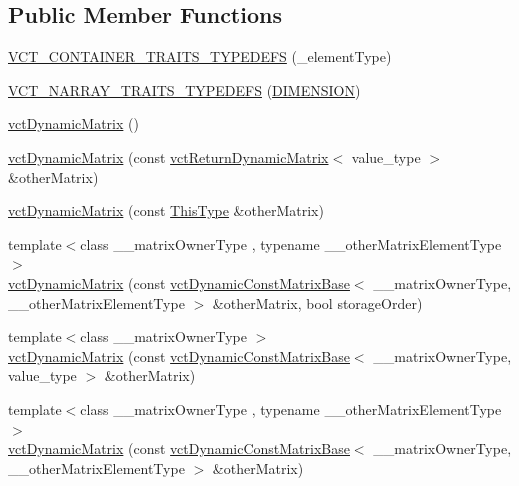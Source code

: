 \subsection*{Public Member Functions}
\begin{DoxyCompactItemize}
\item 
\hyperlink{classvct_dynamic_matrix_a2c357d90a642f7b2910e8f437a88aee2}{V\-C\-T\-\_\-\-C\-O\-N\-T\-A\-I\-N\-E\-R\-\_\-\-T\-R\-A\-I\-T\-S\-\_\-\-T\-Y\-P\-E\-D\-E\-F\-S} (\-\_\-element\-Type)
\item 
\hyperlink{classvct_dynamic_matrix_a2e3683c2478e4a056d11548af43bf186}{V\-C\-T\-\_\-\-N\-A\-R\-R\-A\-Y\-\_\-\-T\-R\-A\-I\-T\-S\-\_\-\-T\-Y\-P\-E\-D\-E\-F\-S} (\hyperlink{classvct_dynamic_matrix_a20a06ac370f39d094a3249a08644471aa6b17aeb32aa45c3a75bad3506c9218dc}{D\-I\-M\-E\-N\-S\-I\-O\-N})
\item 
\hyperlink{classvct_dynamic_matrix_a69e9c9ae97fc01a45eca8d04cef247b9}{vct\-Dynamic\-Matrix} ()
\item 
\hyperlink{classvct_dynamic_matrix_a815391e06165da8cc6c4128ff59fd802}{vct\-Dynamic\-Matrix} (const \hyperlink{classvct_return_dynamic_matrix}{vct\-Return\-Dynamic\-Matrix}$<$ value\-\_\-type $>$ \&other\-Matrix)
\item 
\hyperlink{classvct_dynamic_matrix_aa8326cf4d021f6eaa2f4eac256250728}{vct\-Dynamic\-Matrix} (const \hyperlink{classvct_dynamic_const_matrix_base_ac4ff48cbe4d9de3fdef5a02447ffb9db}{This\-Type} \&other\-Matrix)
\item 
{\footnotesize template$<$class \-\_\-\-\_\-matrix\-Owner\-Type , typename \-\_\-\-\_\-other\-Matrix\-Element\-Type $>$ }\\\hyperlink{classvct_dynamic_matrix_a760990f58362687ee4cc3502ee90506c}{vct\-Dynamic\-Matrix} (const \hyperlink{classvct_dynamic_const_matrix_base}{vct\-Dynamic\-Const\-Matrix\-Base}$<$ \-\_\-\-\_\-matrix\-Owner\-Type, \-\_\-\-\_\-other\-Matrix\-Element\-Type $>$ \&other\-Matrix, bool storage\-Order)
\item 
{\footnotesize template$<$class \-\_\-\-\_\-matrix\-Owner\-Type $>$ }\\\hyperlink{classvct_dynamic_matrix_a38239f2b95f6e13a94cef953b770de40}{vct\-Dynamic\-Matrix} (const \hyperlink{classvct_dynamic_const_matrix_base}{vct\-Dynamic\-Const\-Matrix\-Base}$<$ \-\_\-\-\_\-matrix\-Owner\-Type, value\-\_\-type $>$ \&other\-Matrix)
\item 
{\footnotesize template$<$class \-\_\-\-\_\-matrix\-Owner\-Type , typename \-\_\-\-\_\-other\-Matrix\-Element\-Type $>$ }\\\hyperlink{classvct_dynamic_matrix_aa1aa433c332439a0f80c4c5518e2b790}{vct\-Dynamic\-Matrix} (const \hyperlink{classvct_dynamic_const_matrix_base}{vct\-Dynamic\-Const\-Matrix\-Base}$<$ \-\_\-\-\_\-matrix\-Owner\-Type, \-\_\-\-\_\-other\-Matrix\-Element\-Type $>$ \&other\-Matrix)

\end{DoxyCompactItemize}
